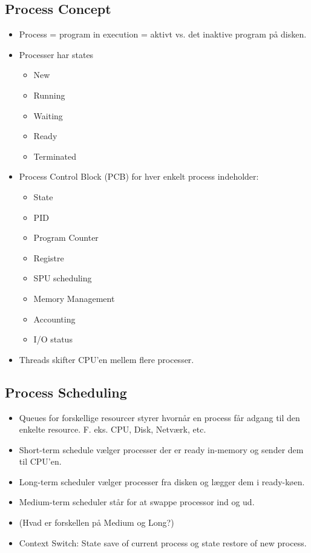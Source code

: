 \documentclass[a4wide,10pt]{article}
\begin{document}
\subsection{Process Concept} %
\label{sub:process_concept}
\begin{itemize}
	\item Process = program in execution = aktivt vs. det inaktive program på disken.
	\item Processer har states
	\begin{itemize}
		\item New
		\item Running
		\item Waiting
		\item Ready
		\item Terminated
	\end{itemize}
	\item Process Control Block (PCB) for hver enkelt process indeholder:
	\begin{itemize}
		\item State
		\item PID
		\item Program Counter
		\item Registre
		\item SPU scheduling
		\item Memory Management
		\item Accounting
		\item I/O status
	\end{itemize}
	\item Threads skifter CPU'en mellem flere processer.
\end{itemize}

\subsection{Process Scheduling} %
\label{sub:3_2}
\begin{itemize}
	\item Queues for forskellige resourcer styrer hvornår en process får adgang til den enkelte resource. F. eks. CPU, Disk, Netværk, etc.
	\item Short-term schedule vælger processer der er ready in-memory og sender dem til CPU'en.
	\item Long-term scheduler vælger processer fra disken og lægger dem i ready-køen.
	\item Medium-term scheduler står for at swappe processor ind og ud.
	\item (Hvad er forskellen på Medium og Long?)
	\item Context Switch: State save of current process og state restore of new process.
\end{itemize}
\end{document}
